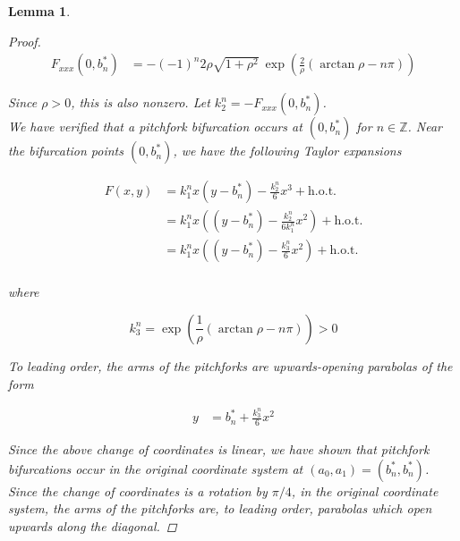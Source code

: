 \documentclass[12pt]{article}
\def\Z{{\mathbb Z}}
\newtheorem{lemma}{Lemma}
\begin{document}
\begin{lemma}
\begin{proof}
\begin{align*}
F_{xxx}(0, b_n^*)
&= -(-1)^n 2 \rho \sqrt{1 + \rho^2} \: \exp{\left(\frac{2}{\rho} (\arctan \rho - n \pi) \right)}
\end{align*}

Since $\rho > 0$, this is also nonzero. Let $k_2^n = -F_{xxx}(0, b^*_n)$. \\

We have verified that a pitchfork bifurcation occurs at $(0, b^*_n)$ for $n \in \Z$. Near the bifurcation points $(0, b_n^*)$, we have the following Taylor expansions

\begin{align*}
F(x, y) &= k_1^n x (y - b_n^*) - \frac{k_2^n}{6} x^3 + \text{h.o.t.} \\
&= k_1^n x \left( (y - b_n^*) - \frac{k_2^n}{6 k_1^n } x^2 \right) + \text{h.o.t.} \\
&= k_1^n x \left( (y - b_n^*) - \frac{k_3^n}{6} x^2 \right) + \text{h.o.t.} \\
\end{align*}

where

\begin{equation*}
k_3^n = \exp{\left(\frac{1}{\rho} (\arctan \rho - n \pi) \right)} > 0
\end{equation*}

To leading order, the arms of the pitchforks are upwards-opening parabolas of the form 

\begin{align*}
y &= b_n^* + \frac{k_3^n}{6} x^2
\end{align*}

Since the above change of coordinates is linear, we have shown that pitchfork bifurcations occur in the original coordinate system at $(a_0, a_1) = (b_n^*, b_n^*)$. Since the change of coordinates is a rotation by $\pi/4$, in the original coordinate system, the arms of the pitchforks are, to leading order, parabolas which open upwards along the diagonal.

\end{proof}
\end{lemma}

\end{document}
